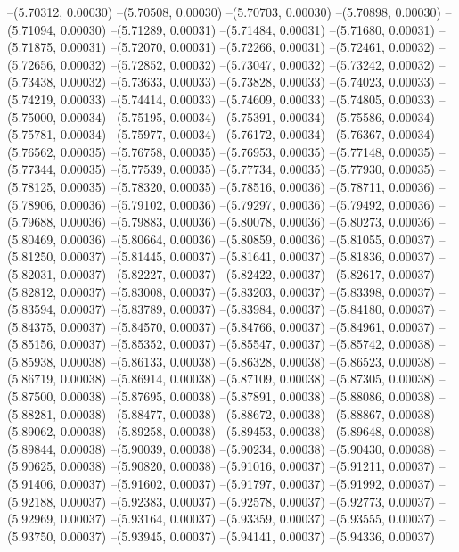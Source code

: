 --(5.70312, 0.00030)
--(5.70508, 0.00030)
--(5.70703, 0.00030)
--(5.70898, 0.00030)
--(5.71094, 0.00030)
--(5.71289, 0.00031)
--(5.71484, 0.00031)
--(5.71680, 0.00031)
--(5.71875, 0.00031)
--(5.72070, 0.00031)
--(5.72266, 0.00031)
--(5.72461, 0.00032)
--(5.72656, 0.00032)
--(5.72852, 0.00032)
--(5.73047, 0.00032)
--(5.73242, 0.00032)
--(5.73438, 0.00032)
--(5.73633, 0.00033)
--(5.73828, 0.00033)
--(5.74023, 0.00033)
--(5.74219, 0.00033)
--(5.74414, 0.00033)
--(5.74609, 0.00033)
--(5.74805, 0.00033)
--(5.75000, 0.00034)
--(5.75195, 0.00034)
--(5.75391, 0.00034)
--(5.75586, 0.00034)
--(5.75781, 0.00034)
--(5.75977, 0.00034)
--(5.76172, 0.00034)
--(5.76367, 0.00034)
--(5.76562, 0.00035)
--(5.76758, 0.00035)
--(5.76953, 0.00035)
--(5.77148, 0.00035)
--(5.77344, 0.00035)
--(5.77539, 0.00035)
--(5.77734, 0.00035)
--(5.77930, 0.00035)
--(5.78125, 0.00035)
--(5.78320, 0.00035)
--(5.78516, 0.00036)
--(5.78711, 0.00036)
--(5.78906, 0.00036)
--(5.79102, 0.00036)
--(5.79297, 0.00036)
--(5.79492, 0.00036)
--(5.79688, 0.00036)
--(5.79883, 0.00036)
--(5.80078, 0.00036)
--(5.80273, 0.00036)
--(5.80469, 0.00036)
--(5.80664, 0.00036)
--(5.80859, 0.00036)
--(5.81055, 0.00037)
--(5.81250, 0.00037)
--(5.81445, 0.00037)
--(5.81641, 0.00037)
--(5.81836, 0.00037)
--(5.82031, 0.00037)
--(5.82227, 0.00037)
--(5.82422, 0.00037)
--(5.82617, 0.00037)
--(5.82812, 0.00037)
--(5.83008, 0.00037)
--(5.83203, 0.00037)
--(5.83398, 0.00037)
--(5.83594, 0.00037)
--(5.83789, 0.00037)
--(5.83984, 0.00037)
--(5.84180, 0.00037)
--(5.84375, 0.00037)
--(5.84570, 0.00037)
--(5.84766, 0.00037)
--(5.84961, 0.00037)
--(5.85156, 0.00037)
--(5.85352, 0.00037)
--(5.85547, 0.00037)
--(5.85742, 0.00038)
--(5.85938, 0.00038)
--(5.86133, 0.00038)
--(5.86328, 0.00038)
--(5.86523, 0.00038)
--(5.86719, 0.00038)
--(5.86914, 0.00038)
--(5.87109, 0.00038)
--(5.87305, 0.00038)
--(5.87500, 0.00038)
--(5.87695, 0.00038)
--(5.87891, 0.00038)
--(5.88086, 0.00038)
--(5.88281, 0.00038)
--(5.88477, 0.00038)
--(5.88672, 0.00038)
--(5.88867, 0.00038)
--(5.89062, 0.00038)
--(5.89258, 0.00038)
--(5.89453, 0.00038)
--(5.89648, 0.00038)
--(5.89844, 0.00038)
--(5.90039, 0.00038)
--(5.90234, 0.00038)
--(5.90430, 0.00038)
--(5.90625, 0.00038)
--(5.90820, 0.00038)
--(5.91016, 0.00037)
--(5.91211, 0.00037)
--(5.91406, 0.00037)
--(5.91602, 0.00037)
--(5.91797, 0.00037)
--(5.91992, 0.00037)
--(5.92188, 0.00037)
--(5.92383, 0.00037)
--(5.92578, 0.00037)
--(5.92773, 0.00037)
--(5.92969, 0.00037)
--(5.93164, 0.00037)
--(5.93359, 0.00037)
--(5.93555, 0.00037)
--(5.93750, 0.00037)
--(5.93945, 0.00037)
--(5.94141, 0.00037)
--(5.94336, 0.00037)
